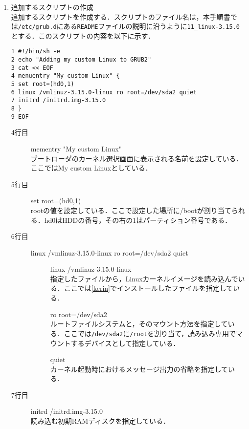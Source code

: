 \documentclass[12pt]{jsarticle}
\begin{document}
\begin{enumerate}
  \item 追加するスクリプトの作成\\
   追加するスクリプトを作成する．スクリプトのファイル名は，本手順書では\verb|/etc/grub.d|にある\verb|README|ファイルの説明に沿うように\verb|11_linux-3.15.0|とする．このスクリプトの内容を以下に示す．
    
\begin{verbatim}
1 #!/bin/sh -e
2 echo "Adding my custom Linux to GRUB2"
3 cat << EOF
4 menuentry "My custom Linux" {
5 set root=(hd0,1)
6 linux /vmlinuz-3.15.0-linux ro root=/dev/sda2 quiet
7 initrd /initrd.img-3.15.0
8 }
9 EOF
\end{verbatim}
\begin{description}
\item[4行目] mementry "My custom Linux"\\
ブートローダのカーネル選択画面に表示される名前を設定している．ここではMy custom Linuxとしている．
\item[5行目] set root=(hd0,1)\\
rootの値を設定している．ここで設定した場所に/bootが割り当てられる．hd0はHDDの番号，その右の1はパーティション番号である．
\item[6行目] linux /vmlinuz-3.15.0-linux ro root=/dev/sda2 quiet\\
  \begin{description}
  \item[] linux /vmlinuz-3.15.0-linux \\
    指定したファイルから，Linuxカーネルイメージを読み込んでいる．ここでは\ref{kerin}でインストールしたファイルを指定している．
  \item[] ro root=/dev/sda2 \\
    ルートファイルシステムと，そのマウント方法を指定している．ここでは\verb|/dev/sda2|に\verb|/root|を割り当て，読み込み専用でマウントするデバイスとして指定している．
  \item[] quiet \\
    カーネル起動時におけるメッセージ出力の省略を指定している．
  \end{description}
\item[7行目] initrd /initrd.img-3.15.0　\\
  読み込む初期RAMディスクを指定している．
\end{description}


\end{enumerate}
\end{document}
